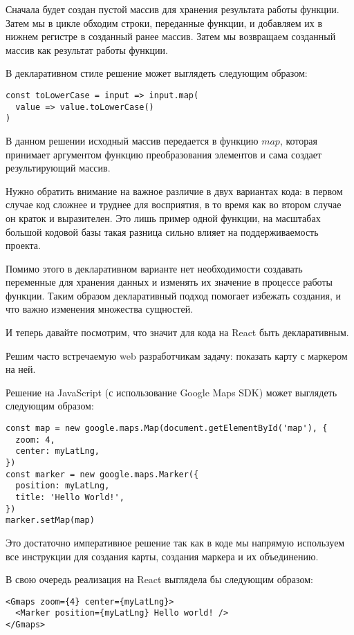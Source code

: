 Сначала будет создан пустой массив для хранения результата работы функции. Затем мы в цикле обходим строки, переданные функции, и добавляем их в нижнем регистре в созданный ранее массив. Затем мы возвращаем созданный массив как результат работы функции.

В декларативном стиле решение может выглядеть следующим образом:

\begin{lstlisting}
const toLowerCase = input => input.map(
  value => value.toLowerCase()
)
\end{lstlisting}

В данном решении исходный массив передается в функцию $map$, которая принимает аргументом функцию преобразования элементов и сама создает результирующий массив.

Нужно обратить внимание на важное различие в двух вариантах кода: в первом случае код сложнее и труднее для восприятия, в то время как во втором случае он краток и выразителен. Это лишь пример одной функции, на масштабах большой кодовой базы такая разница сильно влияет на поддерживаемость проекта.

Помимо этого в декларативном варианте нет необходимости создавать переменные для хранения данных и изменять их значение в процессе работы функции. Таким образом декларативный подход помогает избежать создания, и что важно изменения множества сущностей.

И теперь давайте посмотрим, что значит для кода на React быть декларативным.

Решим часто встречаемую web разработчикам задачу: показать карту с маркером на ней.

Решение на JavaScript (с использование Google Maps SDK) может выглядеть следующим образом:

\begin{lstlisting}
const map = new google.maps.Map(document.getElementById('map'), {
  zoom: 4,
  center: myLatLng,
})
const marker = new google.maps.Marker({
  position: myLatLng,
  title: 'Hello World!',
})
marker.setMap(map)
\end{lstlisting}

Это достаточно императивное решение так как в коде мы напрямую используем все инструкции для создания карты, создания маркера и их объединению.

В свою очередь реализация на React выглядела бы следующим образом:

\begin{lstlisting}
<Gmaps zoom={4} center={myLatLng}>
  <Marker position={myLatLng} Hello world! />
</Gmaps> 
\end{lstlisting}

